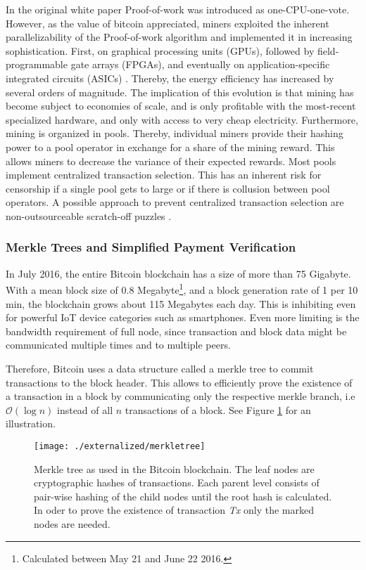 In the original white paper Proof-of-work was introduced as one-CPU-one-vote. However, as the value of bitcoin appreciated, miners exploited the inherent parallelizability of the Proof-of-work algorithm and implemented it in increasing sophistication. First, on graphical processing units (GPUs), followed by field-programmable gate arrays (FPGAs), and eventually on application-specific integrated circuits (ASICs) \parencite{taylor2013bitcoin}. Thereby, the energy efficiency has increased by several orders of magnitude. The implication of this evolution is that mining has become subject to economies of scale, and is only profitable with the most-recent specialized hardware, and only with access to very cheap electricity. Furthermore, mining is organized in pools. Thereby, individual miners provide their hashing power to a pool operator in exchange for a share of the mining reward. This allows miners to decrease the variance of their expected rewards. Most pools implement centralized transaction selection. This has an inherent risk for censorship if a single pool gets to large or if there is collusion between pool operators. A possible approach to prevent centralized transaction selection are non-outsourceable scratch-off puzzles \parencite{Miller:2015:NSP:2810103.2813621}.  

\subsubsection{Merkle Trees and Simplified Payment Verification}
\label{sec:spv}

In July 2016, the entire Bitcoin blockchain has a size of more than 75 Gigabyte. With a mean block size of 0.8 Megabyte\footnote{Calculated between May 21 and June 22 2016.}, and a block generation rate of 1 per 10 min, the blockchain grows about 115 Megabytes each day. This is inhibiting even for powerful IoT device categories such as smartphones. Even more limiting is the bandwidth requirement of full node, since transaction and block data might be communicated multiple times and to multiple peers. 

Therefore, Bitcoin uses a data structure called a merkle tree \parencite{merkle1980protocols} to commit transactions to the block header. This allows to efficiently prove the existence of a transaction in a block by communicating only the respective merkle branch, i.e $\mathcal{O}(\log{}n)$ instead of all $n$ transactions of a block. See Figure \ref{fig:merkletree} for an illustration. 

\begin{figure}[!t]
    \centering
    \texttt{[image: ./externalized/merkletree]}
    \caption{Merkle tree as used in the Bitcoin blockchain. The leaf nodes are cryptographic hashes of transactions. Each parent level consists of pair-wise hashing of the child nodes until the root hash is calculated. In oder to prove the existence of transaction \emph{Tx} only the marked nodes are needed.}
    \label{fig:merkletree}
  \end{figure} 

